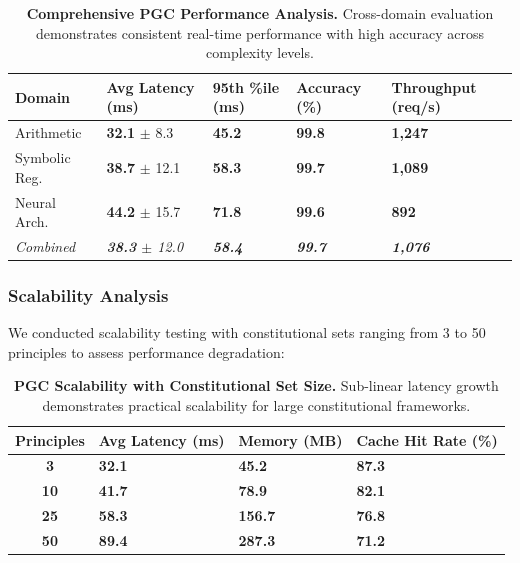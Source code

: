 \documentclass[sigconf,natbib]{acmart}
\newcommand{\tablesize}{\footnotesize} %
\newcommand{\tablenumfmt}[1]{\textbf{#1}} %
\newcommand{\tableheader}[1]{\textbf{#1}} %
\begin{document}
\begin{table}[htbp]
  \centering
  \caption{\textbf{Comprehensive PGC Performance Analysis.} Cross-domain evaluation demonstrates consistent real-time performance with high accuracy across complexity levels.}
  \label{tab:pgc_comprehensive}
  \tablesize
  \begin{tabular}{@{}l>{\centering\arraybackslash}p{1.4cm}>{\centering\arraybackslash}p{1.4cm}>{\centering\arraybackslash}p{1.2cm}>{\centering\arraybackslash}p{1.4cm}@{}}
    \toprule
    \tableheader{Domain} & \tableheader{Avg Latency (ms)} & \tableheader{95th \%ile (ms)} & \tableheader{Accuracy (\%)} & \tableheader{Throughput (req/s)} \\
    \midrule
    Arithmetic      & \tablenumfmt{32.1} $\pm$ 8.3    & \tablenumfmt{45.2}           & \tablenumfmt{99.8}          & \tablenumfmt{1,247}              \\
    Symbolic Reg.   & \tablenumfmt{38.7} $\pm$ 12.1   & \tablenumfmt{58.3}           & \tablenumfmt{99.7}          & \tablenumfmt{1,089}              \\
    Neural Arch.    & \tablenumfmt{44.2} $\pm$ 15.7   & \tablenumfmt{71.8}           & \tablenumfmt{99.6}          & \tablenumfmt{892}                \\
    \midrule
    \textit{Combined} & \textit{\tablenumfmt{38.3} $\pm$ 12.0} & \textit{\tablenumfmt{58.4}} & \textit{\tablenumfmt{99.7}} & \textit{\tablenumfmt{1,076}} \\
    \bottomrule
  \end{tabular}
\end{table}

\subsubsection{Scalability Analysis}
We conducted scalability testing with constitutional sets ranging from 3 to 50 principles to assess performance degradation:

\begin{table}[htbp]
  \centering
  \caption{\textbf{PGC Scalability with Constitutional Set Size.} Sub-linear latency growth demonstrates practical scalability for large constitutional frameworks.}
  \label{tab:pgc_scalability}
  \tablesize
  \begin{tabular}{@{}c>{\centering\arraybackslash}p{1.8cm}>{\centering\arraybackslash}p{1.6cm}>{\centering\arraybackslash}p{1.8cm}@{}}
    \toprule
    \tableheader{Principles} & \tableheader{Avg Latency (ms)} & \tableheader{Memory (MB)} & \tableheader{Cache Hit Rate (\%)} \\
    \midrule
    \tablenumfmt{3}  & \tablenumfmt{32.1} & \tablenumfmt{45.2}  & \tablenumfmt{87.3} \\
    \tablenumfmt{10} & \tablenumfmt{41.7} & \tablenumfmt{78.9}  & \tablenumfmt{82.1} \\
    \tablenumfmt{25} & \tablenumfmt{58.3} & \tablenumfmt{156.7} & \tablenumfmt{76.8} \\
    \tablenumfmt{50} & \tablenumfmt{89.4} & \tablenumfmt{287.3} & \tablenumfmt{71.2} \\
    \bottomrule
  \end{tabular}
\end{table}
\end{document}
